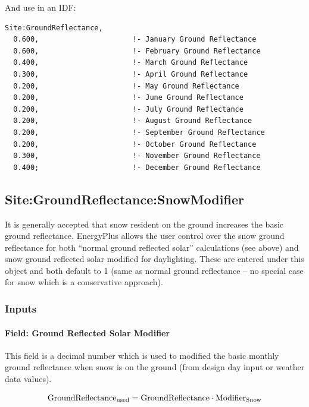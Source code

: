 And use in an IDF:

\begin{lstlisting}
Site:GroundReflectance,
  0.600,                      !- January Ground Reflectance
  0.600,                      !- February Ground Reflectance
  0.400,                      !- March Ground Reflectance
  0.300,                      !- April Ground Reflectance
  0.200,                      !- May Ground Reflectance
  0.200,                      !- June Ground Reflectance
  0.200,                      !- July Ground Reflectance
  0.200,                      !- August Ground Reflectance
  0.200,                      !- September Ground Reflectance
  0.200,                      !- October Ground Reflectance
  0.300,                      !- November Ground Reflectance
  0.400;                      !- December Ground Reflectance
\end{lstlisting}

\subsection{Site:GroundReflectance:SnowModifier}\label{sitegroundreflectancesnowmodifier}

It is generally accepted that snow resident on the ground increases the basic ground reflectance. EnergyPlus allows the user control over the snow ground reflectance for both ``normal ground reflected solar'' calculations (see above) and snow ground reflected solar modified for daylighting. These are entered under this object and both default to 1 (same as normal ground reflectance -- no special case for snow which is a conservative approach).

\subsubsection{Inputs}\label{inputs-20-003}

\paragraph{Field: Ground Reflected Solar Modifier}\label{field-ground-reflected-solar-modifier}

This field is a decimal number which is used to modified the basic monthly ground reflectance when snow is on the ground (from design day input or weather data values).

\begin{equation}
\rm{GroundReflectance}_{\rm{used}} = \rm{GroundReflectance} \cdot \rm{Modifier}_{\rm{Snow}}
\end{equation}


